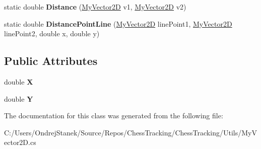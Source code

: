 \begin{DoxyCompactItemize}
\item 
\mbox{\label{class_chess_tracking_1_1_utils_1_1_my_vector2_d_aca06eb0b9590ad9b087656fafb63100e}} 
static double {\bfseries Distance} (\mbox{\hyperlink{class_chess_tracking_1_1_utils_1_1_my_vector2_d}{My\+Vector2D}} v1, \mbox{\hyperlink{class_chess_tracking_1_1_utils_1_1_my_vector2_d}{My\+Vector2D}} v2)
\item 
\mbox{\label{class_chess_tracking_1_1_utils_1_1_my_vector2_d_a982e2131d58acc33114067c897e20d32}} 
static double {\bfseries Distance\+Point\+Line} (\mbox{\hyperlink{class_chess_tracking_1_1_utils_1_1_my_vector2_d}{My\+Vector2D}} line\+Point1, \mbox{\hyperlink{class_chess_tracking_1_1_utils_1_1_my_vector2_d}{My\+Vector2D}} line\+Point2, double x, double y)
\end{DoxyCompactItemize}
\subsection*{Public Attributes}
\begin{DoxyCompactItemize}
\item 
\mbox{\label{class_chess_tracking_1_1_utils_1_1_my_vector2_d_ae192066247cc29d65b921d981c093427}} 
double {\bfseries X}
\item 
\mbox{\label{class_chess_tracking_1_1_utils_1_1_my_vector2_d_ab87788bbb1f49f2eae4802508d0c9282}} 
double {\bfseries Y}
\end{DoxyCompactItemize}


The documentation for this class was generated from the following file\+:\begin{DoxyCompactItemize}
\item 
C\+:/\+Users/\+Ondrej\+Stanek/\+Source/\+Repos/\+Chess\+Tracking/\+Chess\+Tracking/\+Utils/My\+Vector2\+D.\+cs\end{DoxyCompactItemize}
